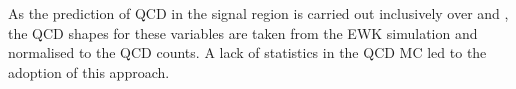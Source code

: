 As the prediction of QCD in the signal region is carried out
inclusively over \nb and \mht, the QCD shapes for these variables are
taken from the EWK simulation and normalised to the QCD counts. 
A lack of statistics in
the QCD MC led to the adoption of this approach. 
%



